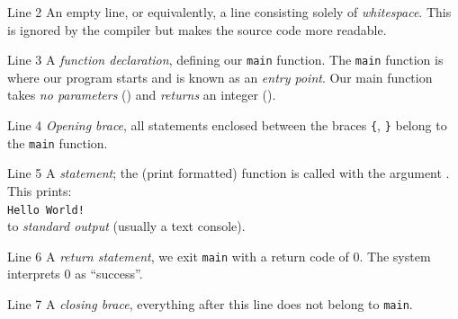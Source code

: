 \documentclass[smaller,handout,table]{beamer}
\begin{document}
\begin{frame}
\begin{block}{Line 2}
An empty line, or equivalently, a line consisting solely of \emph{whitespace}. This is ignored by the compiler but makes the source code more readable.\end{block}

\begin{block}{Line 3}
A \emph{function declaration}, defining our {\tt main} function. The
{\tt main} function is where our program starts and is known as an
\emph{entry point}. Our main function takes \emph{no parameters} () and \emph{returns} an integer ().
\end{block}

\begin{block}{Line 4}
\emph{Opening brace}, all statements enclosed between the braces {\tt\{}, {\tt\}} belong to the {\tt main} function.
\end{block}

\end{frame}

\begin{frame}
\begin{block}{Line 5}
A \emph{statement}; the  (print formatted) function is called with the argument . This prints:\\
{\tt Hello World!}\\
to \emph{standard output} (usually a text console).
\end{block}

\begin{block}{Line 6}
A \emph{return statement}, we exit {\tt main} with a return code of 0. The system interprets 0 as ``success''.
\end{block}


\begin{block}{Line 7}
A \emph{closing brace}, everything after this line does not belong to
{\tt main}.
\end{block}

\end{frame}
\end{document}
